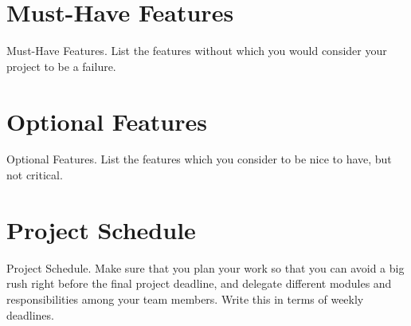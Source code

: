 \section{Must-Have Features}
Must-Have Features. List the features without which you would consider
your project to be a failure.

\section{Optional Features}
Optional Features. List the features which you consider to be nice to
have, but not critical.

\section{Project Schedule}
Project Schedule. Make sure that you plan your work so that you can
avoid a big rush right before the final project deadline, and delegate
different modules and responsibilities among your team members. Write
this in terms of weekly deadlines.


